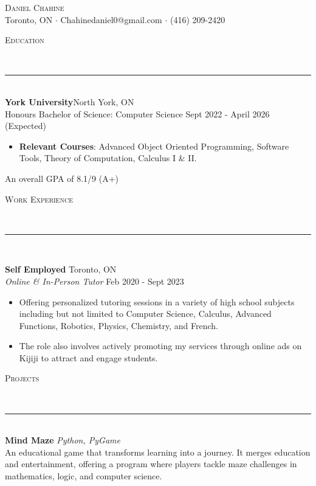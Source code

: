 \documentclass[a4paper]{article}
\newcommand{\lineunder}{
	\vspace*{-8pt} \\
	\hspace*{-18pt} \renewcommand{\hrulefill}{\rule{1.025\textwidth}{1.5pt}} \hrulefill \\
}
\newcommand{\header} [1] {
	{\hspace*{-18pt}\vspace*{6pt} \textsc{#1}}
	\vspace*{-6pt} 
	\lineunder
}
\begin{document}
	\vspace*{-40pt}
	
	
	
	\vspace*{-10pt}
	\begin{center}
		{\Huge \scshape {Daniel Chahine}}\\
		Toronto, ON $\cdot$ Chahinedaniel0@gmail.com $\cdot$ (416) 209-2420\\
	\end{center}
	
	\header{Education}
	\textbf{York University}\hfill North York, ON\\
	Honours Bachelor of Science: Computer Science \hfill Sept 2022 - April 2026 (Expected)\\

	\begin{itemize} \itemsep 0pt
		\item \textbf{Relevant Courses}: Advanced Object Oriented Programming, Software Tools, Theory of Computation, Calculus I \& II.
	\end{itemize}
	\vspace{-2.5mm}
	\hspace{20.7pt}
	An overall GPA of 8.1/9 (A+)
	
	\vspace{3mm}
	
	\header{Work Experience}
	\vspace{1mm}
	
	\textbf{Self Employed} \hfill Toronto, ON\\
	\textit{Online \& In-Person Tutor} \hfill Feb 2020 - Sept 2023\\
	\vspace{-1mm}
	\begin{itemize} \itemsep 1pt
		\item Offering personalized tutoring sessions in a variety of high school subjects including but not limited to Computer Science, Calculus, Advanced Functions, Robotics, Physics, Chemistry, and French.
		\item The role also involves actively promoting my services through online ads on Kijiji to attract and engage students.
	\end{itemize}
	
	\vspace{-1.7mm}
	\header{Projects}

	{\textbf{Mind Maze \textbar{}}} {\sl Python, PyGame} \\
		An educational game that transforms learning into a journey. It merges education and entertainment, offering a program where players tackle maze challenges in mathematics, logic, and computer science.\\
	\vspace*{2mm}
\end{document}
